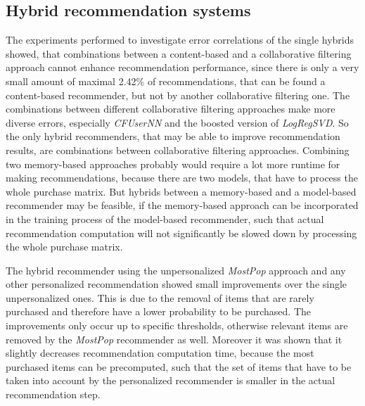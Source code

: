 \documentclass[10pt]{reportMaster}
\begin{document}
\subsection*{Hybrid recommendation systems}
\label{sec:discHybrid}
The experiments performed to investigate error correlations of the single hybrids showed, that combinations between a content-based and a collaborative filtering approach cannot enhance recommendation performance, since there is only a very small amount of maximal 2.42\% of recommendations, that can be found a content-based recommender, but not by another collaborative filtering one.
The combinations between different collaborative filtering approaches make more diverse errors, especially \textit{CFUserNN} and the boosted version of \textit{LogRegSVD}.
So the only hybrid recommenders, that may be able to improve recommendation results, are combinations between collaborative filtering  approaches.
Combining two memory-based approaches probably would require a lot more runtime for making recommendations, because there are two models, that have to process the whole purchase matrix.
But hybrids between a memory-based and a model-based recommender may be feasible, if the memory-based approach can be incorporated in the training process of the model-based recommender, such that actual recommendation computation will not significantly be slowed down by processing the whole purchase matrix. %

The hybrid recommender using the unpersonalized \textit{MostPop} approach and any other personalized recommendation showed small improvements over the single unpersonalized ones.
This is due to the removal of items that are rarely purchased and therefore have a lower probability to be purchased.
The improvements only occur up to specific thresholds, otherwise relevant items are removed by the \textit{MostPop} recommender as well.
Moreover it was shown that it slightly decreases recommendation computation time, because the most purchased items can be precomputed, such that the set of items that have to be taken into account by the personalized recommender is smaller in the actual recommendation step.




\end{document}
